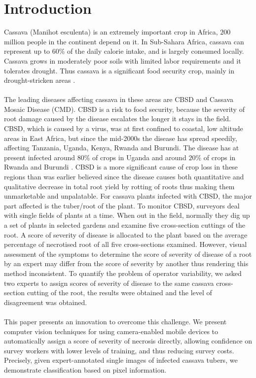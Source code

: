 \documentclass[conference]{IEEEtran}
\begin{document}
\section{Introduction}
Cassava (Manihot esculenta) is an extremely important crop in Africa, $200$ million people in the continent depend on it. In Sub-Sahara Africa, cassava can represent up to 60\% of the daily calorie intake, and is largely consumed locally. Cassava grows in moderately poor soils with limited labor requirements and it tolerates drought. Thus cassava is a significant food security crop, mainly in drought-stricken areas \cite{chavez2005variation}\cite{nassar2007cassava}.\\ \\ The leading diseases affecting cassava in these areas are CBSD and Cassava Mosaic Disease (CMD). CBSD is a risk to food security, because the severity of root damage caused by the disease escalates the longer it stays in the field. CBSD, which is caused by a virus, was at first confined to coastal, low altitude areas in East Africa, but since the mid-2000s the disease has spread speedily, affecting Tanzania, Uganda, Kenya, Rwanda and Burundi. The disease has at present infected around $80\%$ of crops in Uganda and around $20\%$ of crops in Rwanda and Burundi \cite{cass}. CBSD is a more significant cause of crop loss in these regions than was earlier believed \cite{ntawuruhunga2007new} since the disease causes both quantitative and qualitative decrease in total root yield by rotting of roots thus making them unmarketable and unpalatable. For cassava plants infected with CBSD, the major part affected is the tuber/root of the plant. To monitor CBSD, surveyors deal with single fields of plants at a time. When out in the field, normally they dig up a set of plants in selected gardens and examine five cross-section cuttings of the root. A score of severity of disease is allocated to the plant based on the average percentage of necrotised root of all five cross-sections examined. However, visual assessment of the symptoms to determine the score of severity of disease of a root by an expert may differ from the score of severity by another thus rendering this method inconsistent. To quantify the problem of operator variability, we asked two experts to assign scores of severity of disease to the same cassava cross-section cutting of the root, the results were obtained and the level of disagreement was obtained. \\ \\This paper presents an innovation to overcome this challenge. We present computer vision techniques for using camera-enabled mobile devices to automatically assign a score of severity of necrosis directly, allowing confidence on survey workers with lower levels of training, and thus reducing survey costs. Precisely, given expert-annotated single images of infected cassava tubers, we demonstrate classification based on pixel information.
\end{document}
